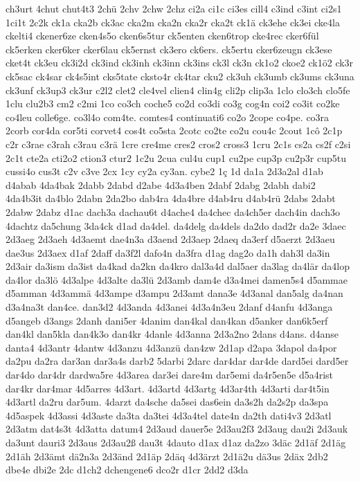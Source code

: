 {ch3urt
4chut
chut4t3
2chü
2chv
2chw
2chz
ci2a
ci1c
ci3es
cill4
c3ind
c3int
ci2s1
1ci1t
2c2k
ck1a
cka2b
ck3ac
cka2m
cka2n
cka2r
cka2t
ck1ä
ck3ehe
ck3ei
cke4la
ckelti4
ckener6ze
cken4s5o
cken6s5tur
ck5enten
cken6trop
cke4rec
cker6fül
ck5erken
cker6ker
cker6lau
ck5ernst
ck3ero
ck6ers.
ck5ertu
cker6zeugn
ck3ese
cket4t
ck3eu
ck3i2d
ck3ind
ck3inh
ck3inn
ck3ins
ck3l
ck3n
ck1o2
ckoe2
ck1ö2
ck3r
ck5sac
ck4sar
ck4s5int
cks5tate
cksto4r
ck4tar
cku2
ck3uh
ck3umb
ck3ums
ck3una
ck3unf
ck3up3
ck3ur
c2l2
clet2
cle4vel
clien4
clin4g
cli2p
clip3a
1clo
clo3ch
clo5fe
1clu
clu2b3
cm2
c2mi
1co
co3ch
coche5
co2d
co3di
co3g
cog4n
coi2
co3it
co2ke
co4leu
colle6ge.
co3l4o
com4te.
comtes4
continuati6
co2o
2cope
co4pe.
co3ra
2corb
cor4da
cor5ti
corvet4
cos4t
co5sta
2cotc
co2te
co2u
cou4c
2cout
1cô
2c1p
c2r
c3rae
c3rah
c3rau
c3rä
1cre
cre4me
cres2
cros2
cross3
1cru
2c1s
cs2a
cs2f
c2si
2c1t
cte2a
cti2o2
ction3
ctur2
1c2u
2cua
cul4u
cup1
cu2pe
cup3p
cu2p3r
cup5tu
cussi4o
cus3t
c2v
c3ve
2cx
1cy
cy2a
cy3an.
cybe2
1ç
1d
da1a
2d3a2al
d1ab
d4abab
4da4bak
2dabb
2dabd
d2abe
4d3a4ben
2dabf
2dabg
2dabh
dabi2
4da4b3it
da4blo
2dabn
2da2bo
dab4ra
4da4bre
d4ab4ru
d4ab4rü
2dabs
2dabt
2dabw
2dabz
d1ac
dach3a
dachau6t
d4ache4
da4chec
da4ch5er
dach4in
dach3o
4dachtz
da5chung
3da4ck
d1ad
da4del.
da4delg
da4dels
da2do
dad2r
da2e
3daec
2d3aeg
2d3aeh
4d3aemt
dae4n3a
d3aend
2d3aep
2daeq
da3erf
d5aerzt
2d3aeu
dae3us
2d3aex
d1af
2daff
da3f2l
dafo4n
da3fra
d1ag
dag2o
da1h
dah3l
da3in
2d3air
da3ism
da3ist
da4kad
da2kn
da4kro
dal3a4d
dal5aer
da3lag
da4lär
da4lop
da4lor
da3lö
4d3alpe
4d3alte
da3lü
2d3amb
dam4e
d3a4mei
damen5s4
d5ammae
d5amman
4d3ammä
4d3ampe
d3ampu
2d3amt
dana3e
4d3anal
dan5alg
da4nan
d3a4na3t
dan4ce.
dan3d2
4d3anda
4d3anei
4d3a4n3eu
2danf
d4anfu
4d3anga
d5angeb
d3angs
2danh
dani5er
4danim
dan4kal
dan4kan
d5anker
dan6k5erf
dan4kl
dan5kla
dan4k3o
dan4kr
4danle
4d3anna
2d3a2no
2dans
d4ans.
d4anse
danta4
4d3antr
4dantw
4d3anzu
4d3anzü
dan4zw
2d1ap
d2apa
3dapol
da4por
da2pu
da2ra
dar3an
dar3a4s
darb2
5darbi
2darc
dar4dar
dar4de
dard5ei
dard5er
dar4do
dar4dr
dardwa5re
4d3area
dar3ei
dare4m
dar5emi
da4r5en5e
d5a4rist
dar4kr
dar4mar
4d5arres
4d3art.
4d3artd
4d3artg
4d3ar4th
4d3arti
dar4t5in
4d3artl
da2ru
dar5um.
4darzt
da4sche
da5sei
das6ein
da3s2h
da2s2p
da3spa
4d5aspek
4d3assi
4d3aste
da3ta
da3tei
4d3a4tel
date4n
da2th
dati4v3
2d3atl
2d3atm
dat4s3t
4d3atta
datum4
2d3aud
dauer5e
2d3au2f3
2d3aug
dau2i
2d3auk
da3unt
dauri3
2d3aus
2d3au2ß
dau3t
4dauto
d1ax
d1az
da2zo
3däc
2d1äf
2d1äg
2d1äh
2d3ämt
dä2n3a
2d3änd
2d1äp
2däq
4d3ärzt
2d1ä2u
dä3us
2däx
2db2
dbe4e
dbi2e
2dc
d1ch2
dchengene6
dco2r
d1cr
2dd2
d3da
}
